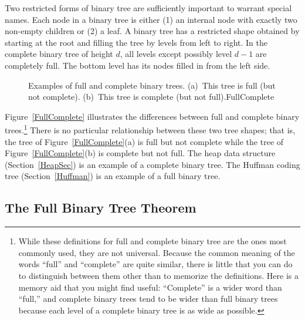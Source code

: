 Two restricted forms of binary tree are sufficiently
important to warrant special names.
Each node in a  binary tree
is either (1) an internal node with exactly two non-empty children or
(2) a leaf.
A  binary tree has
a restricted shape obtained by starting at the root and filling the
tree by levels from left to right.
In the complete binary tree of height \(d\), all levels
except possibly level \(d-1\) are completely full.
The bottom level has its nodes filled in from the left side.

\begin{figure}
\vspace{-\bigskipamount}\vspace{-\medskipamount}

{Examples of full and complete binary trees.
(a)~This tree is full (but not complete).
(b)~This tree is complete (but not full).}{FullComplete}
\medskip
\end{figure}

Figure~\ref{FullComplete} illustrates the differences between full and
complete binary trees.\footnote{
While these definitions for full and complete binary tree are the ones
most commonly used, they are not universal.
Because the common meaning of the words ``full'' and ``complete'' are
quite similar, there is little that you can do to distinguish between
them other than to memorize the definitions.
Here is a memory aid that you might find useful:
``Complete'' is a wider word than ``full,'' and complete binary
trees tend to be wider than full binary trees because each level of a
complete binary tree is as wide as possible.}
There is no particular relationship between these two tree shapes;
that is, the tree of Figure~\ref{FullComplete}(a) is full but not
complete while the tree of Figure~\ref{FullComplete}(b) is complete
but not full.
The heap data structure (Section~\ref{HeapSec}) is an example
of a
complete binary tree.
The Huffman coding tree (Section~\ref{Huffman}) is an example of a
full binary tree.


\subsection{The Full Binary Tree Theorem}
\label{BinSpace}

